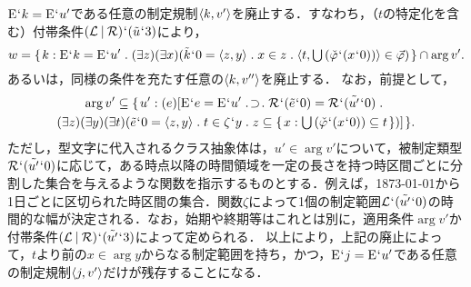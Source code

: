 $ \mathrm{E}{\mspace{1mu}{`}\mspace{1mu}} k = \mathrm{E}{\mspace{1mu}{`}\mspace{1mu}} u' $である任意の制定規制$ \langle k,v' \rangle $を廃止する．すなわち，（$t$の特定化を含む）付帯条件$ (\mathcal{L}\mathbin{\mid}\mathcal{R}){\mspace{1mu}{`}\mspace{1mu}}(\tilde{u}{\mspace{1mu}{`}\mspace{1mu}} 3) $により，
\[
   w = \classab{k:
        \mathrm{E}\fap k = \mathrm{E}\fap u'\con{1}
        (\exists z)(\exists x)(
            \tilde{k}\fap 0 = \orp{z,y}\con{1}x\in z\con{1}\orp{t,\union{(\check{\varphi}\fap(x\fap 0))}}\in\vec{\varphi}
        )
   }\cap\arg v'.
\]
あるいは，同様の条件を充たす任意の$ \langle k,v'' \rangle $を廃止する．
なお，前提として，
\begin{multline*}
    \arg v'\subseteq\classab{u':
    (e)[
        \mathrm{E}\fap e = \mathrm{E}\fap u'\case{1}{1}{1}
        \mathcal{R}\fap(\tilde{e}\fap 0) = \mathcal{R}\fap(\tilde{u'}\fap 0)\con{1}\\
        (\exists z)(\exists y)(\exists t)
        (
            \tilde{e}\fap 0 = \orp{z,y}\con{1}
            t\in\zeta\fap y\con{1}
            z\subseteq\classab{x:\union{(\check{\varphi}\fap(x\fap 0))}\subseteq t}
        )
    ]
    }.
\end{multline*}
ただし，型文字\kagi{$ \zeta $}に代入されるクラス抽象体は，$ u'\in\arg v' $について，被制定類型$ \mathcal{R}{\mspace{1mu}{`}\mspace{1mu}}(\tilde{u'}{\mspace{1mu}{`}\mspace{1mu}} 0) $に応じて，ある時点以降の時間領域を一定の長さを持つ時区間ごとに分割した集合を与えるような関数を指示するものとする．例えば，1873-01-01から1日ごとに区切られた時区間の集合．関数$\zeta$によって1個の制定範囲$ \mathcal{L}{\mspace{1mu}{`}\mspace{1mu}}(\tilde{u'}{\mspace{1mu}{`}\mspace{1mu}} 0) $の時間的な幅が決定される．なお，始期や終期等はこれとは別に，適用条件$ \arg v' $か付帯条件$ (\mathcal{L}\mathbin{\mid}\mathcal{R}){\mspace{1mu}{`}\mspace{1mu}}(\tilde{u'}{\mspace{1mu}{`}\mspace{1mu}} 3) $によって定められる．
以上により，上記の廃止によって，$ t $より前の$x\in\arg y$からなる制定範囲を持ち，かつ，$ \mathrm{E}{\mspace{1mu}{`}\mspace{1mu}} j = \mathrm{E}{\mspace{1mu}{`}\mspace{1mu}} u' $である任意の制定規制$ \langle j,v' \rangle $だけが残存することになる．

